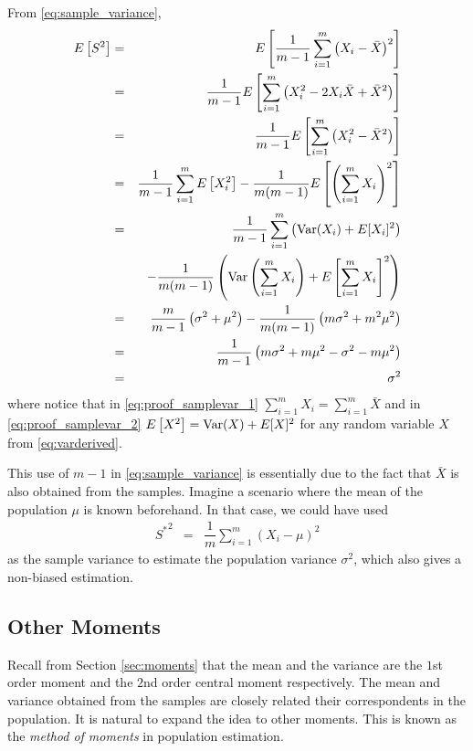 From \eqref{eq:sample_variance},
\begin{eqnarray}
	E\left[S^2\right] &=& E\left[\dfrac{1}{m-1}\sum_{i=1}^{m}\left(X_i - \bar{X}\right)^2\right] \nonumber \\
	&=& \dfrac{1}{m-1} E\left[\sum_{i=1}^{m}\left(X_i^2 - 2X_i\bar{X} + \bar{X}^2\right)\right] \label{eq:proof_samplevar_1} \\
	&=& \dfrac{1}{m-1} E\left[\sum_{i=1}^{m}\left(X_i^2 - \bar{X}^2\right)\right] \nonumber \\
	&=& \dfrac{1}{m-1}\sum_{i=1}^{m} E\left[X_i^2\right] - \dfrac{1}{m(m-1)}E\left[\left(\sum_{i=1}^{m}X_i\right)^2\right] \label{eq:proof_samplevar_2} \\
	&=& \dfrac{1}{m-1}\sum_{i=1}^{m} \left(\textup{Var}(X_i) + E[X_i]^2\right) \nonumber \\ && -  \dfrac{1}{m(m-1)}\left(\textup{Var}\left(\sum_{i=1}^{m}X_i\right) + E\left[\sum_{i=1}^{m}X_i\right]^2\right) \nonumber \\
	&=& \dfrac{m}{m-1}\left(\sigma^2 + \mu^2\right) - \dfrac{1}{m(m-1)}\left(m\sigma^2 + m^2\mu^2\right) \nonumber \\
	&=& \dfrac{1}{m-1}\left(m\sigma^2 + m\mu^2 - \sigma^2 - m\mu^2\right) \nonumber \\
	&=& \sigma^2 \nonumber
\end{eqnarray}
where notice that in \eqref{eq:proof_samplevar_1} $\sum_{i=1}^{m}X_i = \sum_{i=1}^{m}\bar{X}$ and in \eqref{eq:proof_samplevar_2} $E\left[X^2\right] = \textup{Var}(X) + E[X]^2$ for any random variable $X$ from \eqref{eq:varderived}.

This use of $m-1$ in \eqref{eq:sample_variance} is essentially due to the fact that $\bar{X}$ is also obtained from the samples. Imagine a scenario where the mean of the population $\mu$ is known beforehand. In that case, we could have used
\begin{eqnarray}
	{S^*}^2 &=& \dfrac{1}{m}\sum_{i=1}^{m}\left(X_i - \mu\right)^2 \nonumber
\end{eqnarray}
as the sample variance to estimate the population variance $\sigma^2$, which also gives a non-biased estimation.

\subsection{Other Moments}

Recall from Section \ref{sec:moments} that the mean and the variance are the $1$st order moment and the $2$nd order central moment respectively. The mean and variance obtained from the samples are closely related their correspondents in the population. It is natural to expand the idea to other moments. This is known as the \textit{method of moments} in population estimation.

